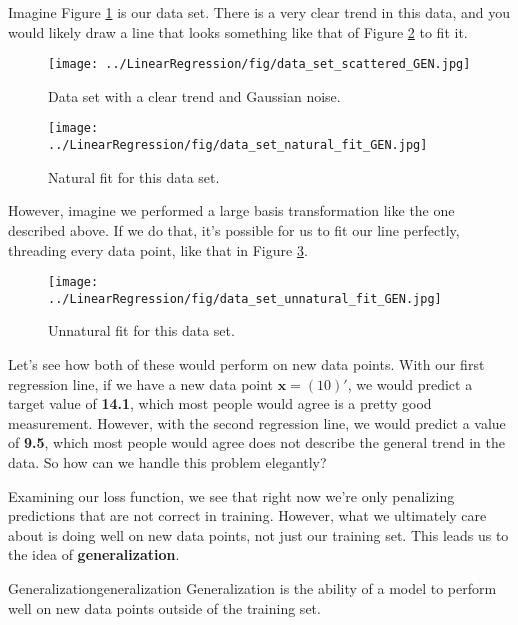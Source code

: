 Imagine Figure \ref{fig:data-set-scattered} is our data set. There is a very clear trend in this data, and you would likely draw a line that looks something like that of Figure \ref{fig:data-set-natural-fit} to fit it.

\begin{figure}
    \centering
    \texttt{[image: ../LinearRegression/fig/data\_set\_scattered\_GEN.jpg]}
    \caption{Data set with a clear trend and Gaussian noise.}
    \label{fig:data-set-scattered}
\end{figure}

\begin{figure}
    \centering
    \texttt{[image: ../LinearRegression/fig/data\_set\_natural\_fit\_GEN.jpg]}
    \caption{Natural fit for this data set.}
    \label{fig:data-set-natural-fit}
\end{figure}

However, imagine we performed a large basis transformation like the one described above. If we do that, it's possible for us to fit our line perfectly, threading every data point, like that in Figure \ref{fig:data-set-unnatural-fit}.

\begin{figure}
    \centering
    \texttt{[image: ../LinearRegression/fig/data\_set\_unnatural\_fit\_GEN.jpg]}
    \caption{Unnatural fit for this data set.}
    \label{fig:data-set-unnatural-fit}
\end{figure}

Let's see how both of these would perform on new data points. With our first regression line, if we have a new data point $\textbf{x} = (10)'$, we would predict a target value of \textbf{14.1}, which most people would agree is a pretty good measurement. However, with the second regression line, we would predict a value of \textbf{9.5}, which most people would agree does not describe the general trend in the data. So how can we handle this problem elegantly?

Examining our loss function, we see that right now we're only penalizing predictions that are not correct in training. However, what we ultimately care about is doing well on new data points, not just our training set. This leads us to the idea of \textbf{generalization}.

\begin{definition}{Generalization}{generalization}
    Generalization is the ability of a model to perform well on new data points outside of the training set.
\end{definition}

